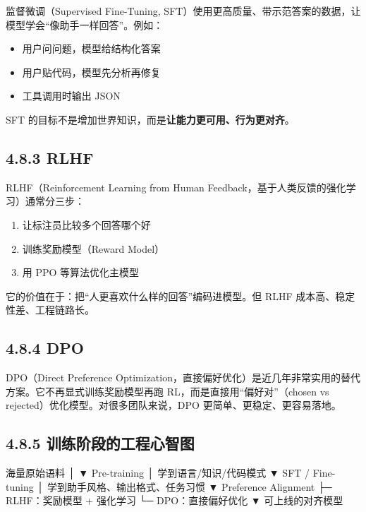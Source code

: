 监督微调（Supervised Fine-Tuning, SFT）使用更高质量、带示范答案的数据，让模型学会``像助手一样回答''。例如：


\begin{itemize}[leftmargin=2em]
\item 用户问问题，模型给结构化答案
\item 用户贴代码，模型先分析再修复
\item 工具调用时输出 JSON
\end{itemize}

SFT 的目标不是增加世界知识，而是\textbf{让能力更可用、行为更对齐}。


\subsection{4.8.3 RLHF}

RLHF（Reinforcement Learning from Human Feedback，基于人类反馈的强化学习）通常分三步：


\begin{enumerate}[leftmargin=2em]
\item 让标注员比较多个回答哪个好
\item 训练奖励模型（Reward Model）
\item 用 PPO 等算法优化主模型
\end{enumerate}

它的价值在于：把``人更喜欢什么样的回答''编码进模型。但 RLHF 成本高、稳定性差、工程链路长。


\subsection{4.8.4 DPO}

DPO（Direct Preference Optimization，直接偏好优化）是近几年非常实用的替代方案。它不再显式训练奖励模型再跑 RL，而是直接用``偏好对''（chosen vs rejected）优化模型。对很多团队来说，DPO 更简单、更稳定、更容易落地。


\subsection{4.8.5 训练阶段的工程心智图}

\begin{codeblock}
海量原始语料
   │
   ▼
Pre-training
   │  学到语言/知识/代码模式
   ▼
SFT / Fine-tuning
   │  学到助手风格、输出格式、任务习惯
   ▼
Preference Alignment
   ├─ RLHF：奖励模型 + 强化学习
   └─ DPO：直接偏好优化
   ▼
可上线的对齐模型
\end{codeblock}

